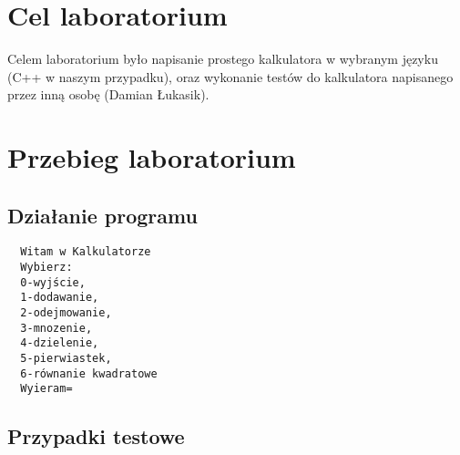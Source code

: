 \documentclass{article}
\begin{document}

\newpage
\section{Cel laboratorium}
Celem laboratorium było napisanie prostego kalkulatora w wybranym języku (C++ w naszym przypadku), oraz wykonanie testów do kalkulatora napisanego przez inną osobę (Damian Łukasik).

\section{Przebieg laboratorium}
\subsection{Działanie programu}

\begin{lstlisting}
  Witam w Kalkulatorze
  Wybierz:
  0-wyjście,
  1-dodawanie,
  2-odejmowanie,
  3-mnozenie,
  4-dzielenie,
  5-pierwiastek,
  6-równanie kwadratowe
  Wyieram=

\end{lstlisting}

\subsection{Przypadki testowe}
\end{document}
